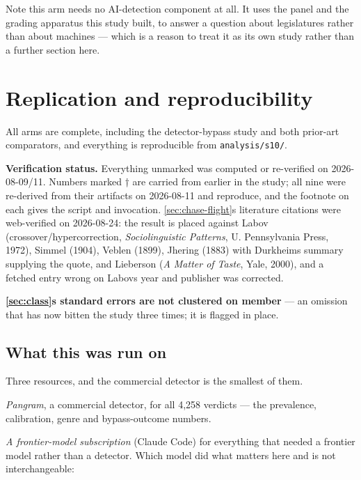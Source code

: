 \begin{enumerate}
  Note this arm needs no AI-detection component at all. It uses the panel and
  the grading apparatus this study built, to answer a question about
  legislatures rather than about machines --- which is a reason to treat it as
  its own study rather than a further section here.
\end{enumerate}

\section{Replication and reproducibility}\label{app:repro}

All arms are complete, including the detector-bypass study and both prior-art
comparators, and everything is reproducible from \texttt{analysis/s10/}.

\textbf{Verification status.} Everything unmarked was computed or re-verified on
2026-08-09/11. Numbers marked † are carried from earlier in the study; all
nine were re-derived from their artifacts on 2026-08-11 and reproduce, and
the footnote on each gives the script and invocation. \cref{sec:chase-flight}\textquotesingle s literature
citations were web-verified on 2026-08-24: the result is placed against Labov
(crossover/hypercorrection, \emph{Sociolinguistic Patterns}, U. Pennsylvania Press,
1972), Simmel (1904), Veblen (1899), Jhering (1883) with Durkheim\textquotesingle s summary
supplying the quote, and Lieberson (\emph{A Matter of Taste}, Yale, 2000), and a
fetched entry wrong on Labov\textquotesingle s year and publisher was corrected.

\textbf{\cref{sec:class}\textquotesingle s standard errors are not clustered on member} --- an omission that has
now bitten the study three times; it is flagged in place.

\subsection{What this was run on}\label{sec:run-on}

Three resources, and the commercial detector is the
smallest of them.

\emph{Pangram}, a commercial detector, for all 4,258 verdicts --- the prevalence,
calibration, genre and bypass-outcome numbers.

\emph{A frontier-model subscription} (Claude Code) for everything that needed a
frontier model rather than a detector. Which model did what matters here and is
not interchangeable:

